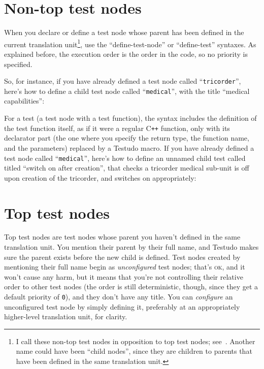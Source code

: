 \documentclass[twoside, a4paper, article]{memoir}
\providecommand\typesetexample[1]{%
}
\newcommand*\Cpp{C\texttt{++}}
\begin{document}
\typesetexample{define-test-ellipses}

\section{Non-top test nodes}
\label{sec:non-top-test-nodes}

When you declare or define a test node whose parent has been defined in the
current translation unit\footnote{I call these non-top test nodes in opposition
  to top test nodes; see~.  Another name could have
  been ``child nodes'', since they are children to parents that have been
  defined in the same translation unit.}, use the ``define-test-node'' or
``define-test'' syntaxes.  As explained before, the execution order is the
order in the code, so no priority is specified.

So, for instance, if you have already defined a test node called
``\texttt{tricorder}'', here's how to define a child test node called
``\texttt{medical}'', with the title ``medical capabilities'':

\typesetexample{define-test-node}

For a test (a test node with a test function), the syntax includes the
definition of the test function itself, as if it were a regular \Cpp{}
function, only with its declarator part (the one where you specify the return
type, the function name, and the parameters) replaced by a Testudo macro.  If
you have already defined a test node called ``\texttt{medical}'', here's how to
define an unnamed child test called titled ``switch on after creation'', that
checks a tricorder medical sub-unit is off upon creation of the tricorder, and
switches on appropriately:

\typesetexample{define-test-full}

\section{Top test nodes}
\label{sec:top-test-nodes}

Top test nodes are test nodes whose parent you haven't defined in the same
translation unit.  You mention their parent by their full name, and Testudo
makes sure the parent exists before the new child is defined.  Test nodes
created by mentioning their full name begin as \emph{unconfigured} test nodes;
that's \textsc{ok}, and it won't cause any harm, but it means that you're not
controlling their relative order to other test nodes (the order is still
deterministic, though, since they get a default priority of \texttt{0}), and
they don't have any title.  You can \emph{configure} an unconfigured test node
by simply defining it, preferably at an appropriately higher-level translation
unit, for clarity.
\end{document}
